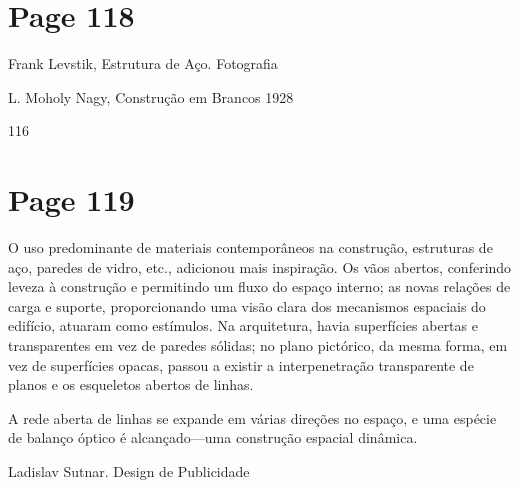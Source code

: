 \documentclass[a4paper]{article}
\begin{document}
\newpage
\section*{Page 118}

Frank Levstik, Estrutura de Aço. Fotografia

L. Moholy Nagy, Construção em Brancos 1928

116

\newpage
\section*{Page 119}

O uso predominante de materiais contemporâneos na construção, estruturas de aço, paredes de vidro, etc., adicionou mais inspiração. Os vãos abertos, conferindo leveza à construção e permitindo um fluxo do espaço interno; as novas relações de carga e suporte, proporcionando uma visão clara dos mecanismos espaciais do edifício, atuaram como estímulos. Na arquitetura, havia superfícies abertas e transparentes em vez de paredes sólidas; no plano pictórico, da mesma forma, em vez de superfícies opacas, passou a existir a interpenetração transparente de planos e os esqueletos abertos de linhas.

A rede aberta de linhas se expande em várias direções no espaço, e uma espécie de balanço óptico é alcançado---uma construção espacial dinâmica.

\raggedleft
Ladislav Sutnar. Design de Publicidade
\par
\end{document}
